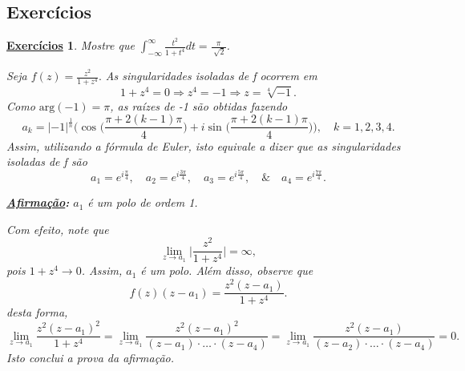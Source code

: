 \documentclass{article}
\newtheorem*{exer*}{\underline{Exerc\'icios}}
\begin{document}
  \subsection{Exercícios}
  \begin{exer*}
    Mostre que \(\int_{-\infty}^{\infty}\frac{t^{2}}{1+t^{4}}dt = \frac{\pi }{\sqrt[]{2}}\).

    Seja \(f(z) = \frac{z^{2}}{1+z^{4}}.\) As singularidades isoladas de f ocorrem em 
    \[
      1 + z^{4} = 0 \Rightarrow z^{4} = -1 \Rightarrow z = \sqrt[4]{-1}.
    \]
    Como \(\mathrm{arg}(-1) = \pi \), as raízes de -1 são obtidas fazendo 
    \[
      a_{k} = |-1|^{\frac{1}{n}}\biggl(\cos^{}{\biggl(\frac{\pi + 2(k-1)\pi }{4}\biggr)} + i\sin^{}{\biggl(\frac{\pi + 2(k-1)\pi }{4}\biggr)}\biggr),\quad k=1, 2, 3, 4.
    \]
    Assim, utilizando a fórmula de Euler, isto equivale a dizer que as singularidades isoladas de f são
    \[
      a_{1} = e^{i \frac{\pi }{4}},\quad a_{2} = e^{i \frac{3\pi }{4}},\quad a_3=e^{i \frac{5\pi }{4}},\quad\&\quad a_{4}=e^{i \frac{7\pi }{4}}.
    \] 

    \textbf{\underline{Afirmação}:} \(a_{1}\) é um polo de ordem 1.

    Com efeito, note que 
    \[
      \lim_{z\to a_{1}}\biggl\vert \frac{z^{2}}{1+z^{4}} \biggr\vert = \infty,
    \]
    pois \(1 + z^{4}\to 0\). Assim, \(a_{1}\) é um polo. Além disso, observe que 
    \[
      f(z)(z-a_1) = \frac{z^{2}(z-a_{1})}{1 + z^{4}}.
    \]
    desta forma, 
    \[
      \lim_{z\to a_{1}}\frac{z^{2}(z-a_{1})^{2}}{1+z^{4}}=\lim_{z\to a_{1}}\frac{z^{2}(z-a_{1})^{2}}{(z-a_{1})\cdot \dotsc \cdot (z-a_{4})} = \lim_{z\to a_{1}}\frac{z^{2}(z-a_{1})}{(z-a_{2})\cdot \dotsc \cdot (z-a_{4})} = 0.
    \]
    Isto conclui a prova da afirmação.


\end{exer*}
\end{document}
